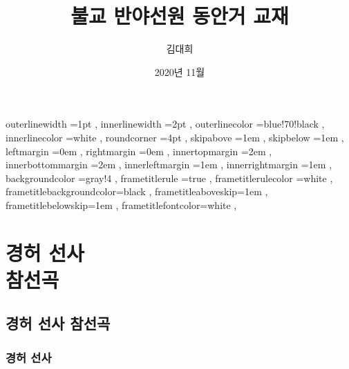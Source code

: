 \documentclass[12pt, a4paper, oneside]{book}
\let\stdsection\section
\renewcommand\section{\newpage\stdsection}
\begin{document}
	
			\dominitoc
			\doparttoc			




			\title{ 불교 반야선원 동안거 교재 }
			\author{김대희}
			\date{ 2020년 11월 }
			\maketitle


			\tableofcontents 		%
			\cleardoublepage
			\listoftables 			%





		 {
						outerlinewidth		=1pt			,%
						innerlinewidth		=2pt			,%
						outerlinecolor		=blue!70!black	,%
						innerlinecolor		=white 			,%
						roundcorner			=4pt			,%
						skipabove			=1em 			,%
						skipbelow			=1em 			,%
						leftmargin			=0em			,%
						rightmargin			=0em			,%
						innertopmargin		=2em 			,%
						innerbottommargin 	=2em 			,%
						innerleftmargin		=1em 			,%
						innerrightmargin		=1em 			,%
						backgroundcolor		=gray!4			,%
						frametitlerule		=true 			,%
						frametitlerulecolor	=white			,%
						frametitlebackgroundcolor=black		,%
						frametitleaboveskip=1em 			,%
						frametitlebelowskip=1em 			,%
						frametitlefontcolor=white 			,%
						}



	\part[경허 선사 참선곡]{ 경허 선사 \\ 참선곡 }
	\noptcrule
	\parttoc				


%										
	\chapter{ 경허 선사 참선곡}


%										
	\section{ 경허 선사}
\end{document}

